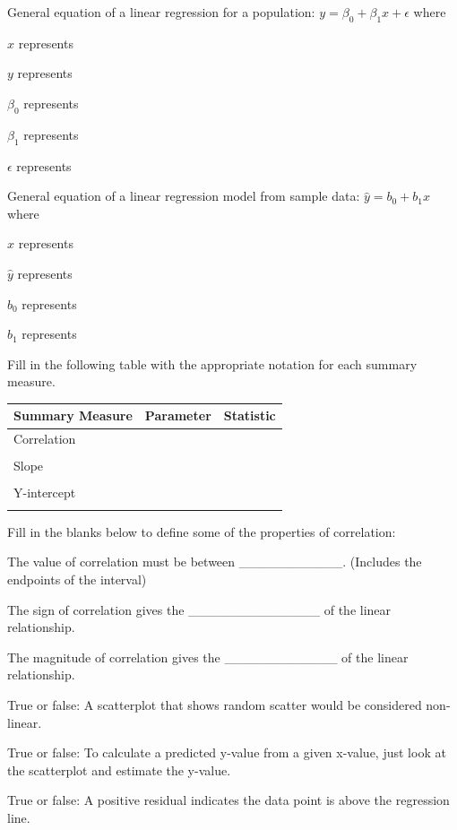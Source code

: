 \documentclass[
]{report}
\newcommand{\rgs}{\vspace{12pt}} %
\newcommand{\rgi}{\hspace{24pt}}  %
\begin{document}
General equation of a linear regression for a population: \(y= \beta_0+ \beta_1 x+\epsilon\) where

\rgi \(x\) represents
\rgs

\rgi \(y\) represents
\rgs

\rgi \(\beta_0\) represents
\rgs

\rgi \(\beta_1\) represents
\rgs

\rgi \(\epsilon\) represents
\rgs

General equation of a linear regression model from sample data: \(\hat{y}= b_0+ b_1 x\) where

\rgi \(x\) represents
\rgs

\rgi \(\hat{y}\) represents
\rgs

\rgi \(b_0\) represents
\rgs

\rgi \(b_1\) represents
\rgs

Fill in the following table with the appropriate notation for each summary measure.

\begin{center}
\begin{tabular}{|l|p{2in}|p{2in}|} \hline
Summary Measure & Parameter & Statistic \\ \hline
Correlation & & \\ 
& & \\ \hline
Slope & & \\ 
& & \\ \hline
Y-intercept & & \\ 
& & \\ \hline
\end{tabular}
\end{center}

Fill in the blanks below to define some of the properties of correlation:

\rgi The value of correlation must be between \_\_\_\_\_\_\_\_\_\_\_. (Includes the endpoints of the interval)

\rgi The sign of correlation gives the \_\_\_\_\_\_\_\_\_\_\_\_\_\_ of the linear relationship.

\rgi The magnitude of correlation gives the \_\_\_\_\_\_\_\_\_\_\_\_ of the linear relationship.

True or false: A scatterplot that shows random scatter would be considered non-linear.

True or false: To calculate a predicted y-value from a given x-value, just look at the scatterplot and estimate the y-value.

True or false: A positive residual indicates the data point is above the regression line.
\end{document}
